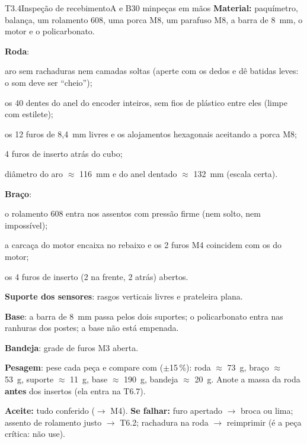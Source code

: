 \documentclass[11pt,a4paper]{article}
\newcommand{\arq}[1]{\path{#1}}                    %
\newcommand{\flecha}{\ensuremath{\rightarrow}}
\newcommand{\aprox}{\ensuremath{\approx}}
\begin{document}
\begin{tarefa}[critica]{T3.4}{Inspeção de recebimento}{A e B}{30 min}{peças em mãos}
\textbf{Material:} paquímetro, balança, um rolamento 608, uma porca M8, um parafuso M8, a
barra de 8~mm, o motor e o policarbonato.
\begin{passos}
  \item \textbf{Roda}:
    \begin{checklist}
      \item aro sem rachaduras nem camadas soltas (aperte com os dedos e dê batidas leves:
        o som deve ser ``cheio'');
      \item os 40 dentes do anel do encoder inteiros, sem fios de plástico entre eles
        (limpe com estilete);
      \item os 12 furos de 8,4~mm livres e os alojamentos hexagonais aceitando a porca M8;
      \item 4 furos de inserto atrás do cubo;
      \item diâmetro do aro \aprox{} 116~mm e do anel dentado \aprox{} 132~mm (escala
        certa).
    \end{checklist}
  \item \textbf{Braço}:
    \begin{checklist}
      \item o rolamento 608 entra nos assentos com pressão firme (nem solto, nem
        impossível);
      \item a carcaça do motor encaixa no rebaixo e os 2 furos M4 coincidem com os do motor;
      \item os 4 furos de inserto (2 na frente, 2 atrás) abertos.
    \end{checklist}
  \item \textbf{Suporte dos sensores}: rasgos verticais livres e prateleira plana.
  \item \textbf{Base}: a barra de 8~mm passa pelos dois suportes; o policarbonato entra nas
    ranhuras dos postes; a base não está empenada.
  \item \textbf{Bandeja}: grade de furos M3 aberta.
  \item \textbf{Pesagem}: pese cada peça e compare com \arq{cad/stl/massas.json}
    ($\pm$15\,\%): roda \aprox{} 73~g, braço \aprox{} 53~g, suporte \aprox{} 11~g, base
    \aprox{} 190~g, bandeja \aprox{} 20~g. Anote a massa da roda \textbf{antes} dos insertos
    (ela entra na T6.7).
\end{passos}
\textbf{Aceite:} tudo conferido (\flecha{} M4).\quad
\textbf{Se falhar:} furo apertado \flecha{} broca ou lima; assento de rolamento justo \flecha{}
T6.2; rachadura na roda \flecha{} reimprimir (é a peça crítica: não use).
\end{tarefa}
\end{document}
